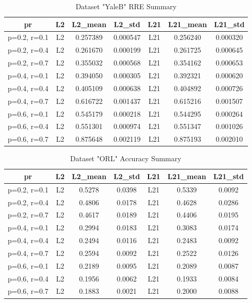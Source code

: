 \begin{table}[h]
\centering
\begin{tabular}{c c c c c c c}
\hline
\textbf{pr} & \textbf{L2} & \textbf{L2\_mean} & \textbf{L2\_std} & \textbf{L21} & \textbf{L21\_mean} & \textbf{L21\_std} \\
\hline
p=0.2, r=0.1 & L2 & 0.257389 & 0.000547 & L21 & 0.256240 & 0.000320 \\
p=0.2, r=0.4 & L2 & 0.261670 & 0.000199 & L21 & 0.261725 & 0.000645 \\
p=0.2, r=0.7 & L2 & 0.355032 & 0.000568 & L21 & 0.354162 & 0.000653 \\
p=0.4, r=0.1 & L2 & 0.394050 & 0.000305 & L21 & 0.392321 & 0.000620 \\
p=0.4, r=0.4 & L2 & 0.405109 & 0.000638 & L21 & 0.404892 & 0.000726 \\
p=0.4, r=0.7 & L2 & 0.616722 & 0.001437 & L21 & 0.615216 & 0.001507 \\
p=0.6, r=0.1 & L2 & 0.545179 & 0.000218 & L21 & 0.544295 & 0.000264 \\
p=0.6, r=0.4 & L2 & 0.551301 & 0.000974 & L21 & 0.551347 & 0.001026 \\
p=0.6, r=0.7 & L2 & 0.875648 & 0.002119 & L21 & 0.875193 & 0.002010 \\
\hline
\end{tabular}
\caption{Dataset "YaleB" RRE Summary}
\label{tab:yaleb_rre}
\end{table}

\begin{table}[p]
\centering
\begin{tabular}{c c c c c c c}
\hline
\textbf{pr} & \textbf{L2} & \textbf{L2\_mean} & \textbf{L2\_std} & \textbf{L21} & \textbf{L21\_mean} & \textbf{L21\_std} \\
\hline
p=0.2, r=0.1 & L2 & 0.5278 & 0.0398 & L21 & 0.5339 & 0.0092 \\
p=0.2, r=0.4 & L2 & 0.4806 & 0.0178 & L21 & 0.4628 & 0.0286 \\
p=0.2, r=0.7 & L2 & 0.4617 & 0.0189 & L21 & 0.4406 & 0.0195 \\
p=0.4, r=0.1 & L2 & 0.2994 & 0.0183 & L21 & 0.3083 & 0.0174 \\
p=0.4, r=0.4 & L2 & 0.2494 & 0.0116 & L21 & 0.2483 & 0.0092 \\
p=0.4, r=0.7 & L2 & 0.2594 & 0.0092 & L21 & 0.2522 & 0.0126 \\
p=0.6, r=0.1 & L2 & 0.2189 & 0.0095 & L21 & 0.2089 & 0.0087 \\
p=0.6, r=0.4 & L2 & 0.1956 & 0.0062 & L21 & 0.1933 & 0.0084 \\
p=0.6, r=0.7 & L2 & 0.1883 & 0.0021 & L21 & 0.2000 & 0.0088 \\
\hline
\end{tabular}
\caption{Dataset "ORL" Accuracy Summary}
\label{tab:orl_acc}
\end{table}

